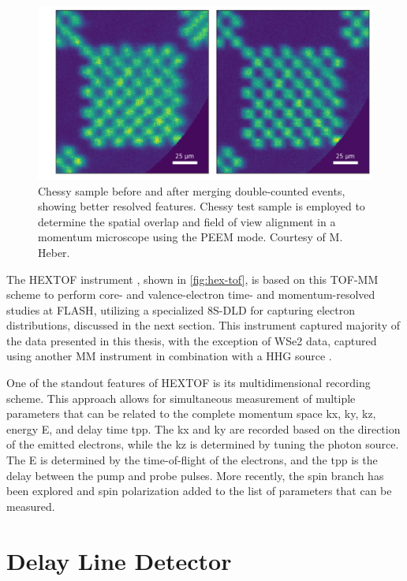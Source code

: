 \begin{figure}
    \centering
    \includegraphics[width=0.7\linewidth]{images/chessy_deblurring_merged_events.png}
    \caption{Chessy sample before and after merging double-counted events, showing better resolved features. Chessy test sample is employed to determine the spatial overlap and field of view alignment in a momentum microscope using the \gls{PEEM} mode. Courtesy of M. Heber.}
    \label{fig:chessy-distribution}
\end{figure}

The \gls{HEXTOF} instrument \cite{kutnyakhovTimeMomentumresolvedPhotoemission2020}, shown in \cref{fig:hex-tof}, is based on this \gls{TOF}-\gls{MM} scheme to perform core- and valence-electron time- and momentum-resolved studies at \gls{FLASH}, utilizing a specialized \num{8}S-\gls{DLD} for capturing electron distributions, discussed in the next section. This instrument captured majority of the data presented in this thesis, with the exception of \gls{WSe2} data, captured using another \gls{MM} instrument in combination with a \gls{HHG} source \cite{maklarQuantitativeComparisonTimeflight2020}.

One of the standout features of \gls{HEXTOF} is its multidimensional recording scheme. This approach allows for simultaneous measurement of multiple parameters that can be related to the complete momentum space \gls{kx}, \gls{ky}, \gls{kz}, energy \gls{E}, and delay time \gls{tpp}. The \gls{kx} and \gls{ky} are recorded based on the direction of the emitted electrons, while the \gls{kz} is determined by tuning the photon source. The \gls{E} is determined by the time-of-flight of the electrons, and the \gls{tpp} is the delay between the pump and probe pulses. More recently, the spin branch has been explored and spin polarization added to the list of parameters that can be measured. 

\section{Delay Line Detector}\label{section:dld}
